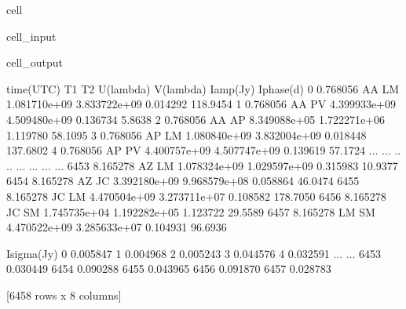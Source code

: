 \documentclass[letterpaper,10pt,english]{jupyterBook}
\begin{document}
\begin{sphinxuseclass}{cell}\begin{sphinxVerbatimInput}

\begin{sphinxuseclass}{cell_input}
\begin{sphinxVerbatim}[commandchars=\\\{\}]
  
   
\end{sphinxVerbatim}

\end{sphinxuseclass}\end{sphinxVerbatimInput}
\begin{sphinxVerbatimOutput}

\begin{sphinxuseclass}{cell_output}
\begin{sphinxVerbatim}[commandchars=\\\{\}]
      \PYGZsh{}time(UTC)  T1  T2     U(lambda)     V(lambda)  Iamp(Jy)  Iphase(d)  \PYGZbs{}
0       0.768056  AA  LM  1.081710e+09 \PYGZhy{}3.833722e+09  0.014292  \PYGZhy{}118.9454   
1       0.768056  AA  PV \PYGZhy{}4.399933e+09 \PYGZhy{}4.509480e+09  0.136734     5.8638   
2       0.768056  AA  AP  8.349088e+05 \PYGZhy{}1.722271e+06  1.119780    58.1095   
3       0.768056  AP  LM  1.080840e+09 \PYGZhy{}3.832004e+09  0.018448  \PYGZhy{}137.6802   
4       0.768056  AP  PV \PYGZhy{}4.400757e+09 \PYGZhy{}4.507747e+09  0.139619   \PYGZhy{}57.1724   
...          ...  ..  ..           ...           ...       ...        ...   
6453    8.165278  AZ  LM \PYGZhy{}1.078324e+09  1.029597e+09  0.315983    10.9377   
6454    8.165278  AZ  JC  3.392180e+09  9.968579e+08  0.058864    46.0474   
6455    8.165278  JC  LM \PYGZhy{}4.470504e+09  3.273711e+07  0.108582  \PYGZhy{}178.7050   
6456    8.165278  JC  SM  1.745735e+04 \PYGZhy{}1.192282e+05  1.123722   \PYGZhy{}29.5589   
6457    8.165278  LM  SM  4.470522e+09 \PYGZhy{}3.285633e+07  0.104931    96.6936   

      Isigma(Jy)  
0       0.005847  
1       0.004968  
2       0.005243  
3       0.044576  
4       0.032591  
...          ...  
6453    0.030449  
6454    0.090288  
6455    0.043965  
6456    0.091870  
6457    0.028783  

[6458 rows x 8 columns]
\end{sphinxVerbatim}

\end{sphinxuseclass}\end{sphinxVerbatimOutput}

\end{sphinxuseclass}
\sphinxstepscope
\end{document}
